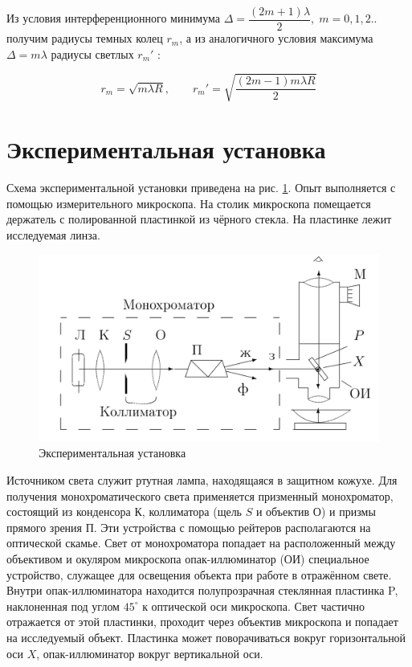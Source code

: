 \documentclass[12pt]{kiarticle}
\begin{document}
	Из условия интерференционного минимума $ \Delta = \dfrac{(2m +1)\lambda}{2}, \; m =0, 1, 2.. $ получим радиусы темных колец $ r_m $, а из аналогичного условия максимума $ \Delta = m \lambda $ радиусы светлых $ r_m' $ :
	
	\begin{equation}\label{r_m'}
	r_m = \sqrt{m \lambda R}, \qquad 	r_m' = \sqrt{\dfrac{(2m-1)m \lambda R}{2}}
	\end{equation}
	
	\section{Экспериментальная установка}

Схема экспериментальной установки приведена на рис. \ref{lab}. Опыт выполняется с помощью измерительного микроскопа.
На столик микроскопа помещается держатель с полированной пластинкой из
чёрного стекла. На пластинке лежит исследуемая линза.

	\begin{figure} 
	\includegraphics[width=\linewidth]{lab}
	\caption{Экспериментальная установка}
	\label{lab}
\end{figure}

	Источником света служит ртутная лампа, находящаяся в защитном кожухе. Для получения монохроматического света применяется призменный монохроматор, состоящий из конденсора $ К $, коллиматора (щель $ S $ и объектив $ О $) и призмы прямого зрения $ П $. Эти устройства с помощью рейтеров располагаются на оптической скамье. Свет от монохроматора попадает на расположенный между объективом и окуляром микроскопа опак-иллюминатор (ОИ)  специальное устройство, служащее для освещения объекта при работе в отражённом свете. Внутри опак-иллюминатора находится полупрозрачная стеклянная пластинка P, наклоненная под углом $ 45^\circ $ к оптической оси микроскопа. Свет частично отражается от этой пластинки, проходит через объектив микроскопа и попадает на исследуемый объект. Пластинка может поворачиваться вокруг горизонтальной оси $ X $, опак-иллюминатор вокруг вертикальной оси.
\end{document}
